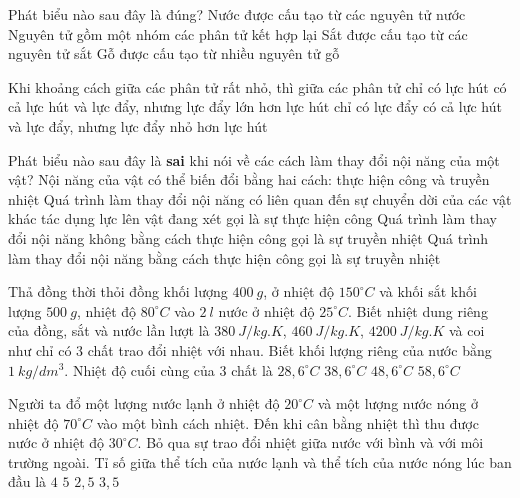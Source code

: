 \begin{ex} %
	Phát biểu nào sau đây là đúng?
	\choice
	{Nước được cấu tạo từ các nguyên tử nước}
	{Nguyên tử gồm một nhóm các phân tử kết hợp lại}
	{\True Sắt được cấu tạo từ các nguyên tử sắt}
	{Gỗ được cấu tạo từ nhiều nguyên tử gỗ}
	\loigiai{}
\end{ex}

\begin{ex} %
	Khi khoảng cách giữa các phân tử rất nhỏ, thì giữa các phân tử
	\choice
	{chỉ có lực hút}
	{\True có cả lực hút và lực đẩy, nhưng lực đẩy lớn hơn lực hút}
	{chỉ có lực đẩy}
	{có cả lực hút và lực đẩy, nhưng lực đẩy nhỏ hơn lực hút}
	\loigiai{}
\end{ex}

\begin{ex} %
	Phát biểu nào sau đây là \textbf{sai} khi nói về các cách làm thay đổi nội năng của một vật?
	\choice
	{Nội năng của vật có thể biến đổi bằng hai cách: thực hiện công và truyền nhiệt}
	{Quá trình làm thay đổi nội năng có liên quan đến sự chuyển dời của các vật khác tác dụng lực lên vật đang xét gọi là sự thực hiện công}
	{Quá trình làm thay đổi nội năng không bằng cách thực hiện công gọi là sự truyền nhiệt}
	{\True Quá trình làm thay đổi nội năng bằng cách thực hiện công gọi là sự truyền nhiệt}
	\loigiai{}
\end{ex}


\begin{ex}%
	Thả đồng thời thỏi đồng khối lượng $400\ g$, ở nhiệt độ $150^{\circ}C$ và khối sắt khối lượng $500\ g$, nhiệt độ $80^{\circ}C$ vào $2\ l$ nước ở nhiệt độ $25^{\circ}C$. Biết nhiệt dung riêng của đồng, sắt và nước lần lượt là $380\ J/kg.K$, $460\ J/kg.K$, $4200\ J/kg.K$ và coi như chỉ có 3 chất trao đổi nhiệt với nhau. Biết khối lượng riêng của nước bằng $1\ kg/dm^3$. Nhiệt độ cuối cùng của 3 chất là
	\choice
	{\True $28,6^{\circ}C$}
	{$38,6^{\circ}C$}
	{$48,6^{\circ}C$}
	{$58,6^{\circ}C$}
\end{ex}

\begin{ex}%
	Người ta đổ một lượng nước lạnh ở nhiệt độ $20^{\circ}C$ và một lượng nước nóng ở nhiệt độ $70^{\circ}C$ vào một bình cách nhiệt. Đến khi cân bằng nhiệt thì thu được nước ở nhiệt độ $30^{\circ}C$. Bỏ qua sự trao đổi nhiệt giữa nước với bình và với môi trường ngoài. Tỉ số giữa thể tích của nước lạnh và thể tích của nước nóng lúc ban đầu là
	\choice
	{\True $4$}
	{$5$}
	{$2,5$}
	{$3,5$}
\end{ex}

